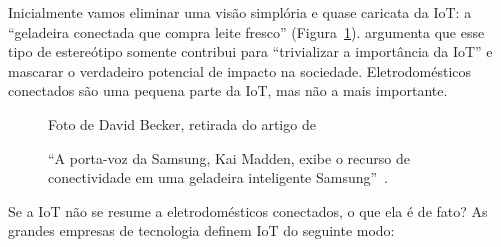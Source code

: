 \documentclass[pdftex, brazil, 12pt, twoside]{article}
\begin{document}
Inicialmente vamos eliminar uma visão simplória e quase caricata da IoT: a
``geladeira conectada que compra leite fresco'' (Figura~\ref{fig:smart-geladeira}).
\citet{UKGOSWalportIoT2014}
argumenta que esse tipo de estereótipo somente contribui para ``trivializar
a importância da IoT'' e mascarar o verdadeiro potencial de impacto na sociedade.
Eletrodomésticos conectados são uma pequena parte da IoT, mas não a mais
importante.

\begin{figure}[h]
  \begin{center}
    \caption{``A porta-voz da Samsung, Kai Madden, exibe o recurso de conectividade em
      uma geladeira inteligente Samsung''~\citep{BajarinIoE2014}.}
    \label{fig:smart-geladeira}

    \footnotesize{Foto de David Becker, retirada do artigo de ~\citet{BajarinIoE2014}}%
  \end{center}
\end{figure}

Se a IoT não se resume a eletrodomésticos conectados, o que ela é de fato? As
grandes empresas de tecnologia definem IoT do seguinte modo:
\end{document}
